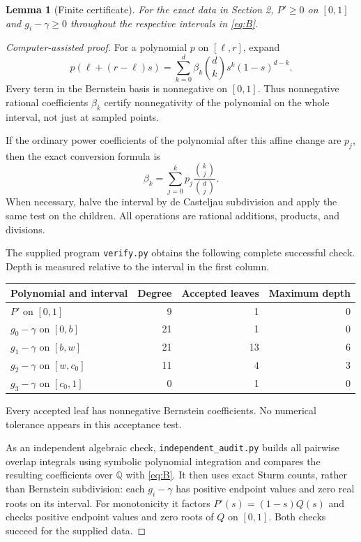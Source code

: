 \documentclass[11pt,a4paper]{article}
\newtheorem{lemma}[theorem]{Lemma}
\theoremstyle{remark}\newtheorem{remark}[theorem]{Remark}
\begin{document}
\begin{lemma}[Finite certificate]\label{lem:cert}
For the exact data in Section 2, $P'\ge0$ on $[0,1]$ and $g_i-\gamma\ge0$ throughout the respective intervals in \eqref{eq:B}.
\end{lemma}
\begin{proof}[Computer-assisted proof]
For a polynomial $p$ on $[\ell,r]$, expand
\[
 p(\ell+(r-\ell)s)
 =\sum_{k=0}^d\beta_k\binom dk s^k(1-s)^{d-k}.
\]
Every term in the Bernstein basis is nonnegative on $[0,1]$. Thus nonnegative rational coefficients $\beta_k$ certify nonnegativity of the polynomial on the whole interval, not just at sampled points.

If the ordinary power coefficients of the polynomial after this affine change are $p_j$, then the exact conversion formula is
\[
 \beta_k=\sum_{j=0}^k p_j\frac{\binom kj}{\binom dj}.
\]
When necessary, halve the interval by de Casteljau subdivision and apply the same test on the children. All operations are rational additions, products, and divisions.

The supplied program \texttt{verify.py} obtains the following complete successful check. Depth is measured relative to the interval in the first column.
\begin{center}
\begin{tabular}{lrrr}
\toprule
Polynomial and interval & Degree & Accepted leaves & Maximum depth\\
\midrule
$P'$ on $[0,1]$ &9&1&0\\
$g_0-\gamma$ on $[0,b]$ &21&1&0\\
$g_1-\gamma$ on $[b,w]$ &21&13&6\\
$g_2-\gamma$ on $[w,c_0]$ &11&4&3\\
$g_3-\gamma$ on $[c_0,1]$ &0&1&0\\
\bottomrule
\end{tabular}
\end{center}
Every accepted leaf has nonnegative Bernstein coefficients. No numerical tolerance appears in this acceptance test.

As an independent algebraic check, \texttt{independent\_audit.py} builds all pairwise overlap integrals using symbolic polynomial integration and compares the resulting coefficients over $\mathbb Q$ with \eqref{eq:B}. It then uses exact Sturm counts, rather than Bernstein subdivision: each $g_i-\gamma$ has positive endpoint values and zero real roots on its interval. For monotonicity it factors $P'(s)=(1-s)Q(s)$ and checks positive endpoint values and zero roots of $Q$ on $[0,1]$. Both checks succeed for the supplied data.
\end{proof}
\end{document}
